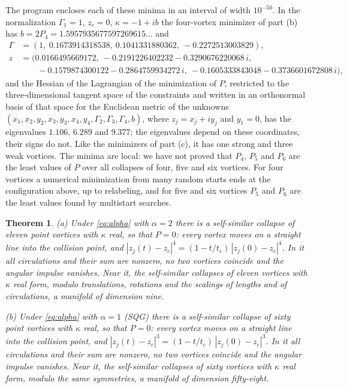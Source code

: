 \documentclass[11pt]{article}
\newtheorem{theorem}{Theorem}
\theoremstyle{definition}
\begin{document}
The program encloses each of these minima in an interval of width $10^{-50}$. In the normalization $\Gamma_1 = 1$, $z_c = 0$, $\kappa = -1 + ib$ the four-vortex minimizer of part (b) has $b = 2P_4 = 1.5957935677597269615\ldots$ and
\begin{align*}
\Gamma &= (1,\ 0.1673914318538,\ 0.1041331880362,\ -0.2272513003829),\\
z &= (0.0166495669172,\ -0.2191226402232 - 0.3290676220068\,i,\\
&\qquad -0.1579874300122 - 0.2864759934272\,i,\ -0.1605333843048 - 0.3736601672808\,i),
\end{align*}
and the Hessian of the Lagrangian of the minimization of $P$, restricted to the three-dimensional tangent space of the constraints and written in an orthonormal basis of that space for the Euclidean metric of the unknowns $(x_1, x_2, y_2, x_3, y_3, x_4, y_4, \Gamma_2, \Gamma_3, \Gamma_4, b)$, where $z_j = x_j + iy_j$ and $y_1 = 0$, has the eigenvalues $1.106$, $6.289$ and $9.377$; the eigenvalues depend on these coordinates, their signs do not. Like the minimizers of part (c), it has one strong and three weak vortices. The minima are local: we have not proved that $P_4$, $P_5$ and $P_6$ are the least values of $P$ over all collapses of four, five and six vortices. For four vortices a numerical minimization from many random starts ends at the configuration above, up to relabeling, and for five and six vortices $P_5$ and $P_6$ are the least values found by multistart searches.

\begin{theorem}\label{thm:norot}
\textup{(a)} Under \eqref{eq:alpha} with $\alpha = 2$ there is a self-similar collapse of eleven point vortices with $\kappa$ real, so that $P = 0$: every vortex moves on a straight line into the collision point, and $|z_j(t) - z_c|^4 = (1 - t/t_c)\,|z_j(0) - z_c|^4$. In it all circulations and their sum are nonzero, no two vortices coincide and the angular impulse vanishes. Near it, the self-similar collapses of eleven vortices with $\kappa$ real form, modulo translations, rotations and the scalings of lengths and of circulations, a manifold of dimension nine.

\textup{(b)} Under \eqref{eq:alpha} with $\alpha = 1$ (SQG) there is a self-similar collapse of sixty point vortices with $\kappa$ real, so that $P = 0$: every vortex moves on a straight line into the collision point, and $|z_j(t) - z_c|^3 = (1 - t/t_c)\,|z_j(0) - z_c|^3$. In it all circulations and their sum are nonzero, no two vortices coincide and the angular impulse vanishes. Near it, the self-similar collapses of sixty vortices with $\kappa$ real form, modulo the same symmetries, a manifold of dimension fifty-eight.
\end{theorem}
\end{document}
